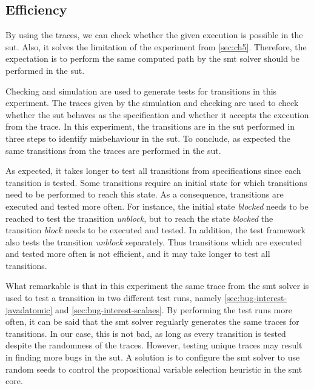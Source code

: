 \subsection{Efficiency}

By using the traces, we can check whether the given execution is possible in the
\gls{sut}. Also, it solves the limitation of the experiment from
\autoref{sec:ch5}. Therefore, the expectation is to perform the same computed
path by the \gls{smt} solver should be performed in the \gls{sut}.

Checking and simulation are used to generate tests for transitions in this
experiment. The traces given by the simulation and checking are used to check
whether the \gls{sut} behaves as the specification and whether it accepts the
execution from the trace. In this experiment, the transitions are in the
\gls{sut} performed in three steps to identify misbehaviour in the \gls{sut}.
To conclude, as expected the same transitions from the traces are performed in
the \gls{sut}.

As expected, it takes longer to test all transitions from specifications since
each transition is tested. Some transitions require an initial state for which
transitions need to be performed to reach this state. As a consequence,
transitions are executed and tested more often. For instance, the initial state
\textit{blocked} needs to be reached to test the transition \textit{unblock},
but to reach the state \textit{blocked} the transition \textit{block} needs to
be executed and tested. In addition, the test framework also tests the
transition \textit{unblock} separately. Thus transitions which are executed and
tested more often is not efficient, and it may take longer to test all
transitions.

What remarkable is that in this experiment the same trace from the \gls{smt}
solver is used to test a transition in two different test runs, namely
\autoref{sec:bug-interest-javadatomic} and \autoref{sec:bug-interest-scalaes}.
By performing the test runs more often, it can be said that the \gls{smt} solver
regularly generates the same traces for transitions. In our case, this is not
bad, as long as every transition is tested despite the randomness of the traces.
However, testing unique traces may result in finding more bugs in the
\gls{sut}. A solution is to configure the \gls{smt} solver to use random seeds
to control the propositional variable selection heuristic in the \gls{smt} core.

